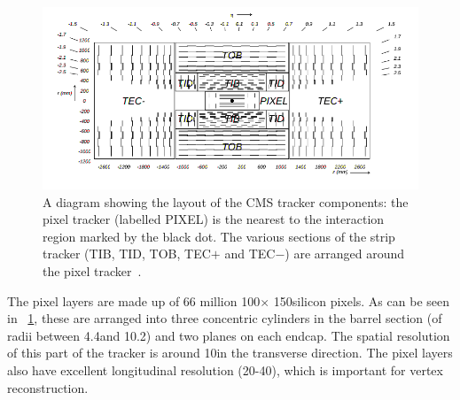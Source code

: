 

\begin{figure}[h]
\centering
\includegraphics[width=1.0\textwidth]{detectorFigures/trackerSchematic.png}
\caption[A diagram showing the layout of the CMS tracker components: the pixel tracker (labelled PIXEL) is the nearest to the interaction region marked by the black dot. The various sections of the strip tracker (TIB, TID, TOB, TEC$+$ and TEC$-$) are arranged around the pixel tracker\quad\cite{CMSTDR}.]{A diagram showing the layout of the CMS tracker components: the pixel tracker (labelled PIXEL) is the nearest to the interaction region marked by the black dot. The various sections of the strip tracker (TIB, TID, TOB, TEC$+$ and TEC$-$) are arranged around the pixel tracker~\cite{CMSTDR}.}
\label{fig:trk}
\end{figure}

The pixel layers are made up of 66 million 100\um $\times$ 150\um silicon pixels. As can be seen in \Fig~\ref{fig:trk}, these are arranged into three concentric cylinders in the barrel section (of radii between 4.4\cm and 10.2\cm) and two planes on each endcap. The spatial resolution of this part of the tracker is around 10\um in the transverse direction. The pixel layers also have excellent longitudinal resolution (20-40\um), which is important for vertex reconstruction.~\cite{trackerperformance2014}

